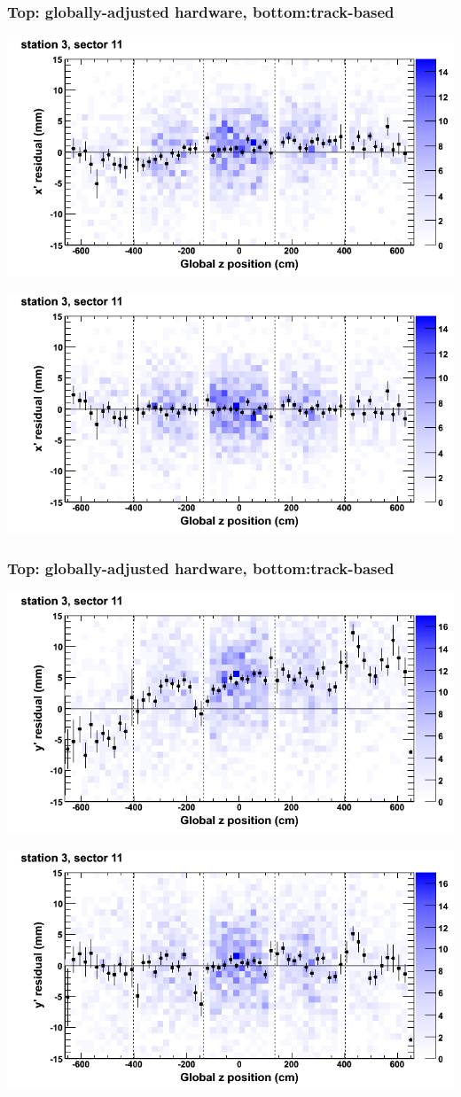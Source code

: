 \documentclass[compress]{beamer}
\begin{document}
\begin{frame}
\frametitle{Top: globally-adjusted hardware, bottom:track-based}
\includegraphics[width=0.7\linewidth]{NOV4_mapplots_HW/DTvsz_st3sec11_x.png}

\includegraphics[width=0.7\linewidth]{NOV4_mapplots/DTvsz_st3sec11_x.png}
\end{frame}

\begin{frame}
\frametitle{Top: globally-adjusted hardware, bottom:track-based}
\includegraphics[width=0.7\linewidth]{NOV4_mapplots_HW/DTvsz_st3sec11_y.png}

\includegraphics[width=0.7\linewidth]{NOV4_mapplots/DTvsz_st3sec11_y.png}
\end{frame}
\end{document}
